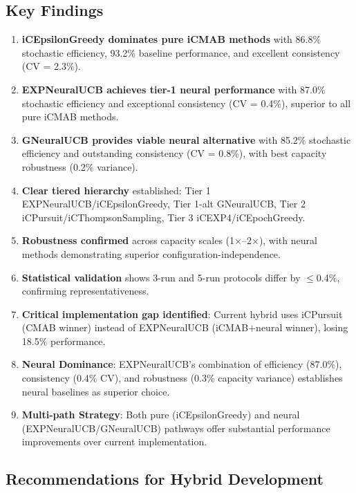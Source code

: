 \documentclass[12pt,a4paper]{article}
\newcommand{\primarytext}[1]{\textcolor{primaryblue}{\textbf{#1}}}
\newcommand{\secondarytext}[1]{\textcolor{secondaryblue}{\textbf{#1}}}
\newcommand{\success}[1]{\textcolor{accentgreen}{\textbf{#1}}}
\newcommand{\warning}[1]{\textcolor{warningred}{\textbf{#1}}}
\newcommand{\legacy}[1]{\textcolor{legacycolor}{\textbf{#1}}}
\newcommand{\neural}[1]{\textcolor{neuralcolor}{\textbf{#1}}}
\begin{document}
\subsection{Key Findings}
\begin{enumerate}
\item \primarytext{iCEpsilonGreedy dominates pure iCMAB methods} with 86.8\% stochastic efficiency, 93.2\% baseline performance, and excellent consistency (CV = 2.3\%).
\item \legacy{EXPNeuralUCB achieves tier-1 neural performance} with 87.0\% stochastic efficiency and exceptional consistency (CV = 0.4\%), superior to all pure iCMAB methods.
\item \neural{GNeuralUCB provides viable neural alternative} with 85.2\% stochastic efficiency and outstanding consistency (CV = 0.8\%), with best capacity robustness (0.2\% variance).
\item \secondarytext{Clear tiered hierarchy} established: Tier 1 EXPNeuralUCB/iCEpsilonGreedy, Tier 1-alt GNeuralUCB, Tier 2 iCPursuit/iCThompsonSampling, Tier 3 iCEXP4/iCEpochGreedy.
\item \success{Robustness confirmed} across capacity scales (1$\times$--2$\times$), with neural methods demonstrating superior configuration-independence.
\item \success{Statistical validation} shows 3-run and 5-run protocols differ by $\leq$0.4\%, confirming representativeness.
\item \warning{Critical implementation gap identified}: Current hybrid uses iCPursuit (CMAB winner) instead of EXPNeuralUCB (iCMAB+neural winner), losing 18.5\% performance.
\item \neural{Neural Dominance}: EXPNeuralUCB's combination of efficiency (87.0\%), consistency (0.4\% CV), and robustness (0.3\% capacity variance) establishes neural baselines as superior choice.
\item \success{Multi-path Strategy}: Both pure (iCEpsilonGreedy) and neural (EXPNeuralUCB/GNeuralUCB) pathways offer substantial performance improvements over current implementation.
\end{enumerate}

\subsection{Recommendations for Hybrid Development}
\end{document}
